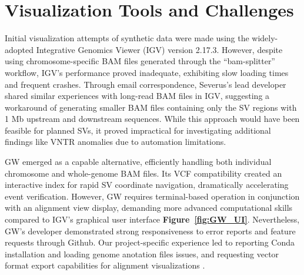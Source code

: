 

\section{Visualization Tools and Challenges}

Initial visualization attempts of synthetic data were made using the 
widely-adopted Integrative Genomics Viewer (IGV) version 2.17.3. However, 
despite using chromosome-specific BAM files generated through the ``bam-splitter'' 
workflow, IGV's performance proved inadequate, exhibiting slow loading times and 
frequent crashes. Through email correspondence, Severus's lead developer shared 
similar experiences with long-read BAM files in IGV, suggesting a workaround of 
generating smaller BAM files containing only the SV regions with 1 Mb upstream 
and downstream sequences. While this approach would have been feasible for 
planned SVs, it proved impractical for investigating additional findings like 
VNTR anomalies due to automation limitations.

GW emerged as a capable alternative, efficiently handling both individual 
chromosome and whole-genome BAM files. Its VCF compatibility created an 
interactive index for rapid SV coordinate navigation, dramatically accelerating 
event verification. However, GW requires terminal-based operation in conjunction 
with an alignment view display, demanding more advanced computational skills 
compared to IGV's graphical user interface \textbf{Figure~\ref{fig:GW_UI}}. 
Nevertheless, GW's developer demonstrated strong responsiveness to error reports 
and feature requests through Github. Our project-specific experience led to 
reporting Conda installation \cite{noauthor_error_nodate} and loading genome
anotation files \cite{noauthor_display_nodate} issues, and requesting vector 
format export capabilities for alignment visualizations 
\cite{noauthor_saving_nodate}.

